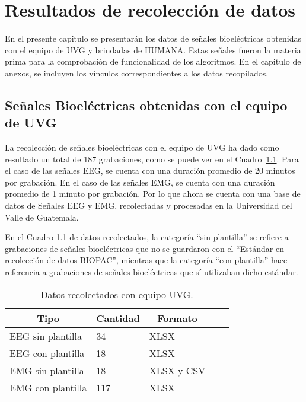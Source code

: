 \chapter{Resultados de recolección de datos}
En el presente capitulo se presentarán los datos de señales bioeléctricas obtenidas con el equipo de UVG y brindadas de HUMANA. Estas señales fueron la materia prima para la comprobación de funcionalidad de los algoritmos. En el capitulo de anexos, se incluyen los vínculos correspondientes a los datos recopilados.

\section{Señales Bioeléctricas obtenidas con el equipo de UVG}
La recolección de señales bioeléctricas con el equipo de UVG ha dado como resultado un total de 187 grabaciones, como se puede ver en el Cuadro~\ref{cuadro:tabla datos UVG}. Para el caso de las señales EEG, se cuenta con una duración promedio de 20 minutos por grabación. En el caso de las señales EMG, se cuenta con una duración promedio de 1 minuto por grabación. Por lo que ahora se cuenta con una base de datos de Señales EEG y EMG, recolectadas y procesadas en la Universidad del Valle de Guatemala.

En el Cuadro \ref{cuadro:tabla datos UVG} de datos recolectados, la categoría ``sin plantilla'' se refiere a grabaciones de señales bioeléctricas que no se guardaron con el ``Estándar en recolección de datos BIOPAC'', mientras que la categoría ``con plantilla'' hace referencia a grabaciones de señales bioeléctricas que sí utilizaban dicho estándar. 

\begin{table}[H]
\begin{center}
    \begin{tabular}{|l|l|l|l|l|}
    \hline
        \multicolumn{1}{|c|}{\textbf{Tipo}} & \multicolumn{1}{c|}{\textbf{Cantidad}} & \multicolumn{1}{c|}{\textbf{Formato}}\\ \hline
        EEG sin plantilla & 34  & XLSX \\ \hline
        EEG con plantilla & 18  & XLSX  \\ \hline
        EMG sin plantilla & 18  & XLSX y CSV \\ \hline
        EMG con plantilla & 117  & XLSX \\ \hline
    \end{tabular}
    \caption[Datos en nube con equipo UVG]{Datos recolectados con equipo UVG.} 
    \label{cuadro:tabla datos UVG}
\end{center}
\end{table}

